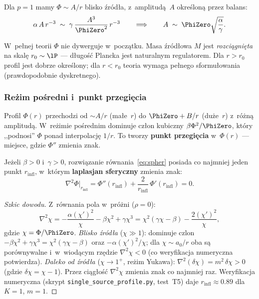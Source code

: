 Dla $p = 1$ mamy $\Phi \sim A/r$ blisko \'zr\'od\l{}a, z~amplitud\k{a}~$A$
okre\'slon\k{a} przez balans:
\begin{equation}\label{eq:near-balance}
  \alpha\,A\,r^{-3}
  \;\sim\; \gamma\,\frac{A^3}{\PhiZero^2}\,r^{-3}
  \qquad\Longrightarrow\qquad
  A \;\sim\; \PhiZero\sqrt{\frac{\alpha}{\gamma}}.
\end{equation}

\begin{proposition}[Regularyzacja \'zr\'od\l{}a]\label{prop:reg}
W~pe\l{}nej teorii $\Phi$ nie dywerguje w~pocz\k{a}tku.
Masa \'zr\'od\l{}owa $M$ jest \emph{rozci\k{a}gni\k{e}ta} na skal\k{e}
$r_0 \sim \lP$ --- d\l{}ugo\'s\'c Plancka jest naturalnym
regulatorem. Dla $r > r_0$ profil jest dobrze okre\'slony;
dla $r < r_0$ teoria wymaga pe\l{}nego sformu\l{}owania
(prawdopodobnie dyskretnego).
\end{proposition}

\subsubsection{Re\.zim po\'sredni i~punkt przegi\k{e}cia}

Profil $\Phi(r)$ przechodzi od $\sim A/r$ (ma\l{}e~$r$) do
$\PhiZero + B/r$ (du\.ze~$r$) z~r\'o\.zn\k{a} amplitud\k{a}.
W~re\.zimie po\'srednim dominuje cz\l{}on kubiczny
$\beta\Phi^2/\PhiZero$, kt\'ory ,,podnosi'' $\Phi$ ponad
interpolacj\k{e} $1/r$. To tworzy \textbf{punkt przegi\k{e}cia}
w~$\Phi(r)$ --- miejsce, gdzie $\Phi''$ zmienia znak.

\begin{lemma}\label{lem:inflection}
Je\.zeli $\beta > 0$ i~$\gamma > 0$, rozwi\k{a}zanie
r\'ownania~\eqref{eq:spher} posiada co najmniej jeden punkt
$r_{\mathrm{infl}}$, w~kt\'orym \textbf{laplasjan sferyczny}
zmienia znak:
\begin{equation}\label{eq:inflection-condition}
  \nabla^2\Phi\big|_{r_{\mathrm{infl}}}
  = \Phi''(r_{\mathrm{infl}}) + \frac{2}{r_{\mathrm{infl}}}\,\Phi'(r_{\mathrm{infl}})
  = 0.
\end{equation}
\end{lemma}

\begin{proof}[Szkic dowodu]
Z~r\'ownania pola w~pr\'o\.zni ($\rho = 0$):
\begin{equation}
  \nabla^2\chi = -\frac{\alpha(\chi')^2}{\chi} - \beta\chi^2 + \gamma\chi^3
  = \chi^2(\gamma\chi - \beta) - \frac{2(\chi')^2}{\chi},
\end{equation}
gdzie $\chi = \Phi/\PhiZero$.
\emph{Blisko \'zr\'od\l{}a} ($\chi \gg 1$): dominuje czlon
$-\beta\chi^2 + \gamma\chi^3 = \chi^2(\gamma\chi - \beta)$ oraz
$-\alpha(\chi')^2/\chi$; dla $\chi \sim a_0/r$ oba s\k{a} por\'ownywalne
i~w~wiod\k{a}cym rz\k{e}dzie $\nabla^2\chi < 0$
(co weryfikacja numeryczna potwierdza).
\emph{Daleko od \'zr\'od\l{}a} ($\chi \to 1^+$, re\.zim Yukawa):
$\nabla^2(\delta\chi) = m^2\,\delta\chi > 0$ (gdzie $\delta\chi = \chi - 1$).
Przez ci\k{a}g\l{}o\'s\'c $\nabla^2\chi$ zmienia znak
co najmniej raz. Weryfikacja numeryczna (skrypt
\texttt{single\_source\_profile.py}, test~T5) daje
$r_{\mathrm{infl}} \approx 0.89$ dla $K = 1$, $m = 1$.
\end{proof}

